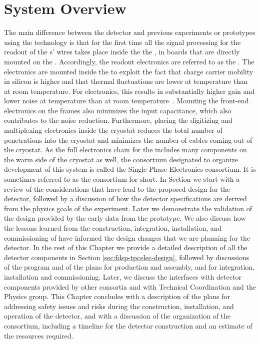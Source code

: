 \section{System Overview}
\label{sec:fdsp-tpcelec-overview}

The main difference between the   detector and 
previous experiments or prototypes using the  technology is
that for the first time all the signal processing for the readout of the
s' wires takes place inside the the , in boards that 
are directly mounted on the . Accordingly, the  
readout electronics are referred to as the . The electronics are 
mounted inside the  to exploit the fact that charge carrier 
mobility in silicon is higher and that thermal fluctuations are lower 
at  temperature than at room temperature. For  
electronics, this results in substantially higher gain and lower noise 
at  temperature than at room temperature~\cite{DeGeronimo:2011zz}.
Mounting the front-end electronics on the  frames also minimizes 
the input capacitance, which also contributes to the noise reduction.  
Furthermore, placing the digitizing and multiplexing electronics inside 
the cryostat reduces the total number of penetrations into the cryostat 
and minimizes the number of cables coming out of the cryostat.  
As the full  electronics chain for the  includes 
many components on the warm side of the cryostat as well, the  
consortium designated to organize development of this system is called 
the  Single-Phase  Electronics consortium. 
It is sometimes referred to as the  consortium for short.
In Section we start with a review of the considerations that
have lead to the proposed design for the   detector,
followed by a discussion of how the detector specifications are derived
from the physics goals of the experiment. Later we demonstrate the 
validation of the design provided by the early data from the 
prototype. We also discuss how the lessons learned from the construction,
integration, installation, and commissioning of  have 
informed the design changes that we are planning for the 
 detector. In the rest of this Chapter we provide a detailed
description of all the  detector components in Section
\ref{sec:fdsp-tpcelec-design}, followed by discussions of the 
program and of the plans for production and assembly, and for integration,
installation and commissioning. Later, we discuss the interfaces with
detector components provided by other consortia and with Technical
Coordination and the Physics group. This Chapter concludes with a description
of the plans for addressing safety issues and risks during the
construction, installation, and operation of the detector, and with
a discussion of the organization of the  consortium,
including a timeline for the detector construction and an estimate
of the resources required.

